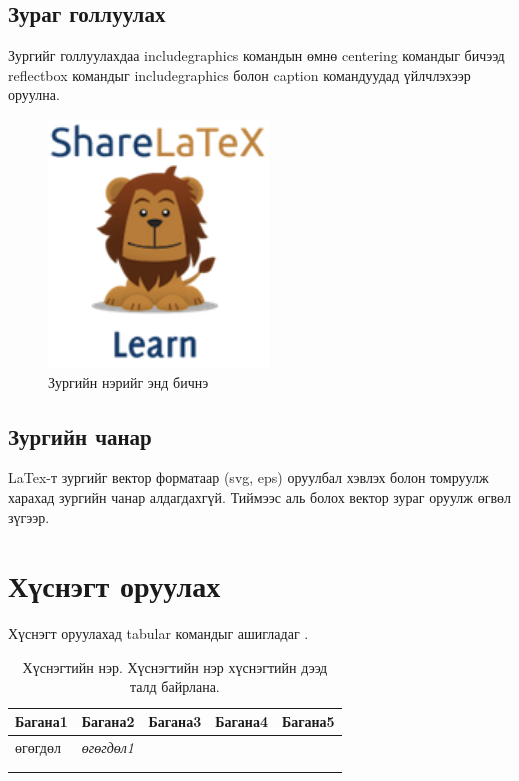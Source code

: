 \documentclass[12pt,A4]{report}
\begin{document}
\section{Зураг голлуулах}
Зургийг голлуулахдаа includegraphics командын өмнө centering 
командыг бичээд reflectbox командыг includegraphics болон caption 
командуудад үйлчлэхээр оруулна.
	
\begin{figure}[h]
		\includegraphics[scale=0.5]{figure01.png}
    	\caption{Зургийн нэрийг энд бичнэ}
	    
\label{fig:lion2}
\end{figure}

\section{Зургийн чанар}
LaTex-т зургийг вектор форматаар (svg, eps) оруулбал хэвлэх болон томруулж харахад зургийн чанар 
алдагдахгүй. Тиймээс аль болох вектор зураг оруулж өгвөл зүгээр. 

\chapter{Хүснэгт оруулах}
Хүснэгт оруулахад tabular командыг ашигладаг \cite{table}. 

\begin{table}[h]
\centering
\caption{Хүснэгтийн нэр. Хүснэгтийн нэр хүснэгтийн дээд талд байрлана. }
\label{my-label}
\begin{tabular}{|l|l|l|l|l|}
\hline
\textbf{Багана1} & \textbf{Багана2}  & \textbf{Багана3} & \textbf{Багана4} & \textbf{Багана5} \\ \hline
өгөгдөл          & \textit{өгөгдөл1} &                  &                  &                  \\ \hline
                 &                   &                  &                  &                  \\ \hline
                 &                   &                  &                  &                  \\ \hline
\end{tabular}
\end{table}
\end{document}
